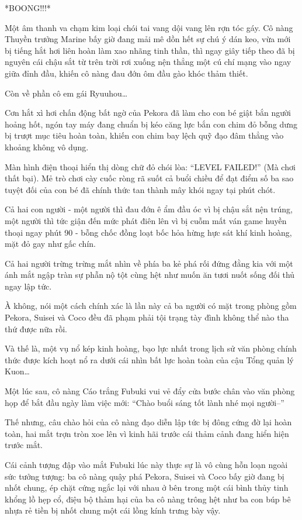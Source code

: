 \documentclass[../main.tex]{subfiles}
\begin{document}
*BOONG!!!*

Một âm thanh va chạm kim loại chói tai vang dội vang lên rợn tóc gáy. Cô nàng Thuyền trưởng Marine bấy giờ đang mải mê dồn hết sự chú ý dán keo, vừa mới bị tiếng hắt hơi liên hoàn làm xao nhãng tinh thần, thì ngay giây tiếp theo đã bị nguyên cái chậu sắt từ trên trời rơi xuống nện thẳng một cú chí mạng vào ngay giữa đỉnh đầu, khiến cô nàng đau đớn ôm đầu gào khóc thảm thiết.

Còn về phần cô em gái Ryuuhou\dots

Cơn hắt xì hơi chấn động bất ngờ của Pekora đã làm cho con bé giật bắn người hoảng hốt, ngón tay máy đang chuẩn bị kéo căng lực bắn con chim đỏ bỗng dưng bị trượt mục tiêu hoàn toàn, khiến con chim bay lệch quỹ đạo đâm thẳng vào khoảng không vô dụng.

Màn hình điện thoại hiển thị dòng chữ đỏ chói lòa: ``LEVEL FAILED!'' (Mà chơi thất bại). Mẻ trò chơi cày cuốc ròng rã suốt cả buổi chiều để đạt điểm số ba sao tuyệt đối của con bé đã chính thức tan thành mây khói ngay tại phút chót.

Cả hai con người - một người thì đau đớn ê ẩm đầu óc vì bị chậu sắt nện trúng, một người thì tức giận đến mức phát điên lên vì bị cuỗm mất ván game huyền thoại ngay phút 90 - bỗng chốc đồng loạt bốc hỏa hừng hực sát khí kinh hoàng, mặt đỏ gay như gấc chín.


Cả hai người trừng trừng mắt nhìn về phía ba kẻ phá rối đứng đằng kia với một ánh mắt ngập tràn sự phẫn nộ tột cùng hệt như muốn ăn tươi nuốt sống đối thủ ngay lập tức.

À không, nói một cách chính xác là lần này cả ba người có mặt trong phòng gồm Pekora, Suisei và Coco đều đã phạm phải tội trạng tày đình không thể nào tha thứ được nữa rồi.

Và thế là, một vụ nổ kép kinh hoàng, bạo lực nhất trong lịch sử văn phòng chính thức được kích hoạt nổ ra dưới cái nhìn bất lực hoàn toàn của cậu Tổng quản lý Kuon\dots

\ct

Một lúc sau, cô nàng Cáo trắng Fubuki vui vẻ đẩy cửa bước chân vào văn phòng họp để bắt đầu ngày làm việc mới: ``Chào buổi sáng tốt lành nhé mọi người--''

Thế nhưng, câu chào hỏi của cô nàng đạo diễn lập tức bị đông cứng đờ lại hoàn toàn, hai mắt trợn tròn xoe lên vì kinh hãi trước cái thảm cảnh đang hiển hiện trước mắt.

Cái cảnh tượng đập vào mắt Fubuki lúc này thực sự là vô cùng hỗn loạn ngoài sức tưởng tượng: ba cô nàng quậy phá Pekora, Suisei và Coco bấy giờ đang bị nhốt chung, ép chặt cứng ngắc lại với nhau ở bên trong một cái bình thủy tinh khổng lồ hẹp cổ, điệu bộ thảm hại của ba cô nàng trông hệt như ba con búp bê nhựa rẻ tiền bị nhốt chung một cái lồng kính trưng bày vậy.
\end{document}
